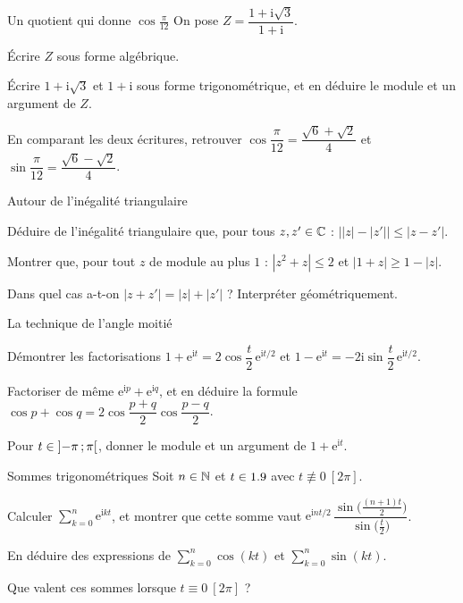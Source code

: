 
\begin{exercice}[2]{Un quotient qui donne $\cos\frac{\pi}{12}$}
On pose $Z=\dfrac{1+\mathrm{i}\sqrt3}{1+\mathrm{i}}$.
\begin{questions}
  \item Écrire $Z$ sous forme algébrique.
  \item Écrire $1+\mathrm{i}\sqrt3$ et $1+\mathrm{i}$ sous forme
    trigonométrique, et en déduire le module et un argument de $Z$.
  \item En comparant les deux écritures, retrouver
    $\cos\dfrac{\pi}{12}=\dfrac{\sqrt6+\sqrt2}{4}$ et
    $\sin\dfrac{\pi}{12}=\dfrac{\sqrt6-\sqrt2}{4}$.
\end{questions}
\end{exercice}

\begin{exercice}[2]{Autour de l'inégalité triangulaire}
\begin{questions}
  \item Déduire de l'inégalité triangulaire que, pour tous $z,z'\in\mathbb{C}$ :
    $\bigl||z|-|z'|\bigr|\leq|z-z'|$.
  \item Montrer que, pour tout $z$ de module au plus $1$ :
    $|z^{2}+z|\leq2$ et $|1+z|\geq1-|z|$.
  \item Dans quel cas a-t-on $|z+z'|=|z|+|z'|$ ? Interpréter géométriquement.
\end{questions}
\end{exercice}

\begin{exercice}[2]{La technique de l'angle moitié}
\begin{questions}
  \item Démontrer les factorisations
    $1+\mathrm{e}^{\mathrm{i}t}=2\cos\dfrac{t}{2}\,\mathrm{e}^{\mathrm{i}t/2}$ et
    $1-\mathrm{e}^{\mathrm{i}t}=-2\mathrm{i}\sin\dfrac{t}{2}\,\mathrm{e}^{\mathrm{i}t/2}$.
  \item Factoriser de même $\mathrm{e}^{\mathrm{i}p}+\mathrm{e}^{\mathrm{i}q}$, et en
    déduire la formule $\cos p+\cos q=2\cos\dfrac{p+q}{2}\cos\dfrac{p-q}{2}$.
  \item Pour $t\in\mathopen{]}-\pi\,{;}\,\pi\mathclose{[}$, donner le module et un argument de
    $1+\mathrm{e}^{\mathrm{i}t}$.
\end{questions}
\end{exercice}

\begin{exercice}[2]{Sommes trigonométriques}
Soit $n\in\mathbb{N}$ et $t\in1.9$ avec $t\not\equiv0\ [2\pi]$.
\begin{questions}
  \item Calculer $\displaystyle\sum_{k=0}^{n}\mathrm{e}^{\mathrm{i}kt}$, et montrer que
    cette somme vaut $\mathrm{e}^{\mathrm{i}nt/2}\,
    \dfrac{\sin\bigl(\frac{(n+1)t}{2}\bigr)}{\sin\bigl(\frac{t}{2}\bigr)}$.
  \item En déduire des expressions de
    $\displaystyle\sum_{k=0}^{n}\cos(kt)$ et $\displaystyle\sum_{k=0}^{n}\sin(kt)$.
  \item Que valent ces sommes lorsque $t\equiv0\ [2\pi]$ ?
\end{questions}
\end{exercice}

